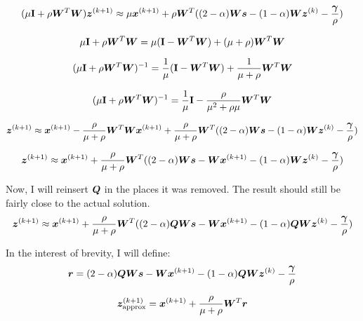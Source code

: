 \documentclass{article}
\begin{document}
\begin{equation}
(\mu{\bf I} + \rho\bm{W}^T\bm{W})\bm{z}^{(k + 1)} \approx \mu\bm{x}^{(k + 1)} + \rho\bm{W}^T((2 - \alpha)\bm{W}\bm{s} - (1 - \alpha)\bm{W}\bm{z}^{(k)} - \frac{\bm{\gamma}}{\rho})
\end{equation}

\begin{equation}
\mu{\bf I} + \rho\bm{W}^T\bm{W} = \mu({\bf I} - \bm{W}^T\bm{W}) + (\mu + \rho)\bm{W}^T\bm{W}
\end{equation}

\begin{equation}
(\mu{\bf I} + \rho\bm{W}^T\bm{W})^{-1} = \frac{1}{\mu}({\bf I} - \bm{W}^T\bm{W}) + \frac{1}{\mu + \rho}\bm{W}^T\bm{W}
\end{equation}

\begin{equation}
(\mu{\bf I} + \rho\bm{W}^T\bm{W})^{-1} = \frac{1}{\mu}{\bf I} - \frac{\rho}{\mu^2 + \rho\mu}\bm{W}^T\bm{W}
\end{equation}

\begin{equation}
\bm{z}^{(k + 1)} \approx \bm{x}^{(k + 1)} - \frac{\rho}{\mu + \rho}\bm{W}^T\bm{W}\bm{x}^{(k + 1)} + \frac{\rho}{\mu + \rho}\bm{W}^T((2 - \alpha)\bm{W}\bm{s} - (1 - \alpha)\bm{W}\bm{z}^{(k)} - \frac{\bm{\gamma}}{\rho})
\end{equation}

\begin{equation}
\bm{z}^{(k + 1)} \approx \bm{x}^{(k + 1)}  + \frac{\rho}{\mu + \rho}\bm{W}^T((2 - \alpha)\bm{W}\bm{s} - \bm{W}\bm{x}^{(k + 1)} - (1 - \alpha)\bm{W}\bm{z}^{(k)} - \frac{\bm{\gamma}}{\rho})
\end{equation}

Now, I will reinsert $\bm{Q}$ in the places it was removed. The result should still be fairly close to the actual solution.
\begin{equation}
\bm{z}^{(k + 1)} \approx \bm{x}^{(k + 1)}  + \frac{\rho}{\mu + \rho}\bm{W}^T((2 - \alpha)\bm{Q}\bm{W}\bm{s} - \bm{W}\bm{x}^{(k + 1)} - (1 - \alpha)\bm{Q}\bm{W}\bm{z}^{(k)} - \frac{\bm{\gamma}}{\rho})
\end{equation}

In the interest of brevity, I will define:
\begin{equation}
\bm{r} = (2 - \alpha)\bm{Q}\bm{W}\bm{s} - \bm{W}\bm{x}^{(k + 1)} - (1 - \alpha)\bm{Q}\bm{W}\bm{z}^{(k)} - \frac{\bm{\gamma}}{\rho}
\end{equation}

\begin{equation}
\bm{z}_{\text{approx}}^{(k + 1)} = \bm{x}^{(k + 1)} + \frac{\rho}{\mu + \rho}\bm{W}^T\bm{r}
\end{equation}
\end{document}

